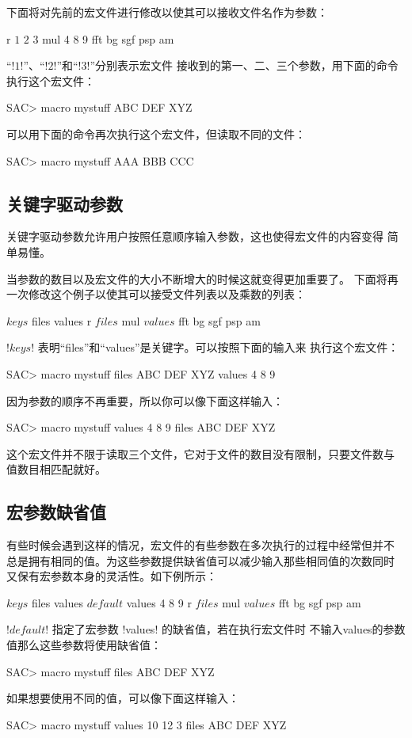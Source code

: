 下面将对先前的宏文件进行修改以使其可以接收文件名作为参数：
\begin{SACCode}
r $1$ $2$ $3$
mul 4 8 9
fft
bg sgf
psp am
\end{SACCode}
``!$1$!''、``!$2$!''和``!$3$!''分别表示宏文件
接收到的第一、二、三个参数，用下面的命令执行这个宏文件：
\begin{SACCode}
SAC> macro mystuff ABC DEF XYZ
\end{SACCode}

可以用下面的命令再次执行这个宏文件，但读取不同的文件：
\begin{SACCode}
SAC> macro mystuff AAA BBB CCC
\end{SACCode}

\subsection{关键字驱动参数}
关键字驱动参数允许用户按照任意顺序输入参数，这也使得宏文件的内容变得
简单易懂。

当参数的数目以及宏文件的大小不断增大的时候这就变得更加重要了。
下面将再一次修改这个例子以使其可以接受文件列表以及乘数的列表：
\begin{SACCode}
$keys$ files values
r $files$
mul $values$
fft
bg sgf
psp am
\end{SACCode}
!$keys$! 表明``files''和``values''是关键字。可以按照下面的输入来
执行这个宏文件：
\begin{SACCode}
SAC> macro mystuff files ABC DEF XYZ values 4 8 9
\end{SACCode}
因为参数的顺序不再重要，所以你可以像下面这样输入：
\begin{SACCode}
SAC> macro mystuff values 4 8 9 files ABC DEF XYZ
\end{SACCode}
这个宏文件并不限于读取三个文件，它对于文件的数目没有限制，只要文件数与
值数目相匹配就好。

\subsection{宏参数缺省值}
有些时候会遇到这样的情况，宏文件的有些参数在多次执行的过程中经常但并不
总是拥有相同的值。为这些参数提供缺省值可以减少输入那些相同值的次数同时
又保有宏参数本身的灵活性。如下例所示：
\begin{SACCode}
$keys$ files values
$default$ values 4 8 9
r $files$
mul $values$
fft
bg sgf
psp am
\end{SACCode}
!$default$! 指定了宏参数 !values! 的缺省值，若在执行宏文件时
不输入values的参数值那么这些参数将使用缺省值：
\begin{SACCode}
SAC> macro mystuff files ABC DEF XYZ
\end{SACCode}
如果想要使用不同的值，可以像下面这样输入：
\begin{SACCode}
SAC> macro mystuff values 10 12 3 files ABC DEF XYZ
\end{SACCode}

